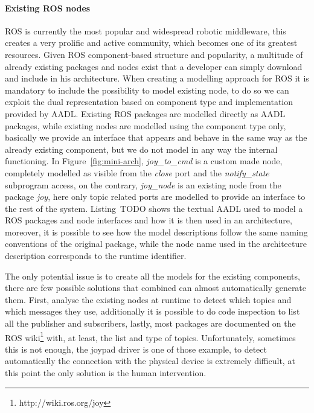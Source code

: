 \paragraph{Existing ROS nodes} ROS is currently the most popular and widespread robotic middleware, this creates a very prolific and active community, which becomes one of its greatest resources. Given ROS component-based structure and popularity,  a multitude of already existing packages and nodes exist that a developer can simply download and include in his architecture. When creating a modelling approach for ROS it is mandatory to include the possibility to model existing node, to do so we can exploit the dual representation based on component type and implementation provided by AADL.  Existing ROS packages are modelled directly as AADL packages, while existing nodes are modelled using the component type only, basically we provide an interface that appears and behave in the same way as the already existing component, but we do not model in any way the internal functioning. In Figure~\ref{fig:mini-arch}, \textit{joy\_to\_cmd} is a custom made node, completely modelled as visible from the \textit{close} port and the \textit{notify\_state} subprogram access, on the contrary, \textit{joy\_node} is an existing node from the package \textit{joy}, here only topic related ports are modelled to provide an interface to the rest of the system. Listing~TODO shows the textual AADL used to model a ROS packages and node interfaces and how it is then used in an architecture, moreover, it is possible to see how the model descriptions follow the same naming conventions of the original package, while the node name used in the architecture description corresponds to the runtime identifier.

The only potential issue is to create all the models for the existing components, there are few possible solutions that combined can almost automatically generate them. First, analyse the existing nodes at runtime to detect which topics and which messages they use, additionally it is possible to do code inspection to list all the publisher and subscribers, lastly, most packages are documented on the ROS wiki\footnote{http://wiki.ros.org/joy} with, at least, the list and type of topics. Unfortunately, sometimes this is not enough, the joypad driver is one of those example, to detect automatically the connection with the physical device is extremely difficult, at this point the only solution is the human intervention.

